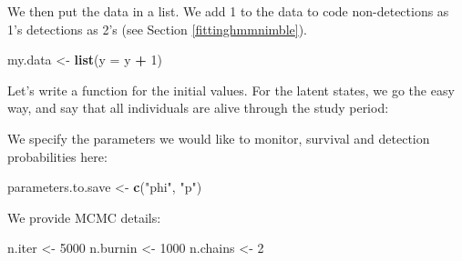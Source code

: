 \documentclass[
  12pt,
]{krantz}
\newenvironment{Shaded}{\begin{snugshade}}{\end{snugshade}}
\newcommand{\AttributeTok}[1]{\textcolor[rgb]{0.13,0.29,0.53}{#1}}
\newcommand{\CommentTok}[1]{\textcolor[rgb]{0.56,0.35,0.01}{\textit{#1}}}
\newcommand{\ControlFlowTok}[1]{\textcolor[rgb]{0.13,0.29,0.53}{\textbf{#1}}}
\newcommand{\DecValTok}[1]{\textcolor[rgb]{0.00,0.00,0.81}{#1}}
\newcommand{\FunctionTok}[1]{\textcolor[rgb]{0.13,0.29,0.53}{\textbf{#1}}}
\newcommand{\NormalTok}[1]{#1}
\newcommand{\OtherTok}[1]{\textcolor[rgb]{0.56,0.35,0.01}{#1}}
\newcommand{\SpecialCharTok}[1]{\textcolor[rgb]{0.81,0.36,0.00}{\textbf{#1}}}
\newcommand{\StringTok}[1]{\textcolor[rgb]{0.31,0.60,0.02}{#1}}
\begin{document}
We then put the data in a list. We add 1 to the data to code non-detections as 1's detections as 2's (see Section \ref{fittinghmmnimble}).

\begin{Shaded}
\begin{Highlighting}[]
\NormalTok{my.data }\OtherTok{\textless{}{-}} \FunctionTok{list}\NormalTok{(}\AttributeTok{y =}\NormalTok{ y }\SpecialCharTok{+} \DecValTok{1}\NormalTok{)}
\end{Highlighting}
\end{Shaded}

Let's write a function for the initial values. For the latent states, we go the easy way, and say that all individuals are alive through the study period:

\begin{Shaded}
\end{Shaded}

We specify the parameters we would like to monitor, survival and detection probabilities here:

\begin{Shaded}
\begin{Highlighting}[]
\NormalTok{parameters.to.save }\OtherTok{\textless{}{-}} \FunctionTok{c}\NormalTok{(}\StringTok{"phi"}\NormalTok{, }\StringTok{"p"}\NormalTok{)}
\end{Highlighting}
\end{Shaded}

We provide MCMC details:

\begin{Shaded}
\begin{Highlighting}[]
\NormalTok{n.iter }\OtherTok{\textless{}{-}} \DecValTok{5000}
\NormalTok{n.burnin }\OtherTok{\textless{}{-}} \DecValTok{1000}
\NormalTok{n.chains }\OtherTok{\textless{}{-}} \DecValTok{2}
\end{Highlighting}
\end{Shaded}
\end{document}

